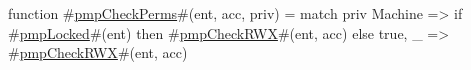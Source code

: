 function #\hyperref[sailRISCVzpmpCheckPerms]{pmpCheckPerms}#(ent, acc, priv) = {
  match priv {
    Machine => if   #\hyperref[sailRISCVzpmpLocked]{pmpLocked}#(ent)
               then #\hyperref[sailRISCVzpmpCheckRWX]{pmpCheckRWX}#(ent, acc)
               else true,
    _       => #\hyperref[sailRISCVzpmpCheckRWX]{pmpCheckRWX}#(ent, acc)
  }
}
